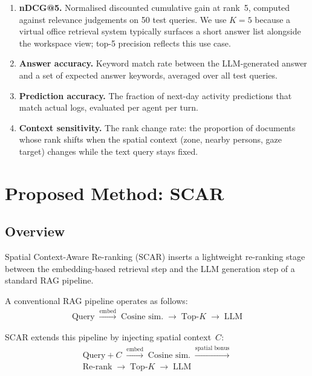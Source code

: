 \documentclass[journal]{IEEEtran}
\begin{document}
\begin{enumerate}
  \item \textbf{nDCG@5.}\;
        Normalised discounted cumulative gain at rank~5, computed
        against relevance judgements on 50 test queries.
        We use $K{=}5$ because a virtual office retrieval system
        typically surfaces a short answer list alongside the
        workspace view; top-5 precision reflects this use case.
  \item \textbf{Answer accuracy.}\;
        Keyword match rate between the LLM-generated answer and a
        set of expected answer keywords, averaged over all test queries.
  \item \textbf{Prediction accuracy.}\;
        The fraction of next-day activity predictions that match
        actual logs, evaluated per agent per turn.
  \item \textbf{Context sensitivity.}\;
        The rank change rate: the proportion of documents whose rank
        shifts when the spatial context (zone, nearby persons, gaze
        target) changes while the text query stays fixed.
\end{enumerate}

\section{Proposed Method: SCAR}
\label{sec:method}

\subsection{Overview}
\label{ssec:overview}

Spatial Context-Aware Re-ranking (SCAR) inserts a lightweight
re-ranking stage between the embedding-based retrieval step and the
LLM generation step of a standard RAG pipeline.

A conventional RAG pipeline operates as follows:
\begin{multline*}
  \text{Query} \;\xrightarrow{\text{embed}}\;
  \text{Cosine sim.} \;\rightarrow\;
  \text{Top-}K \;\rightarrow\;
  \text{LLM}
\end{multline*}

\noindent
SCAR extends this pipeline by injecting spatial context~$C$:
\begin{multline*}
  \text{Query} + C
  \;\xrightarrow{\text{embed}}\;
  \text{Cosine sim.}
  \;\xrightarrow{\text{spatial bonus}}\\
  \text{Re-rank}
  \;\rightarrow\;
  \text{Top-}K
  \;\rightarrow\;
  \text{LLM}
\end{multline*}
\end{document}
